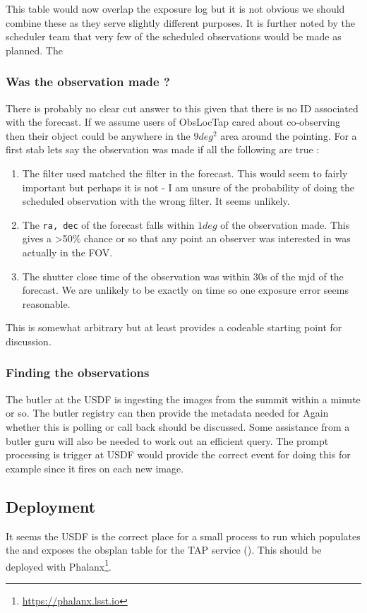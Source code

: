 This table would now overlap the exposure log but it is not obvious we should combine these as they serve slightly different purposes.
It is further noted by the scheduler team that very few of the scheduled observations would be made as planned. The

\subsubsection{Was the  observation made ?}\label{sec:made}
There is probably no clear cut answer to this given that there is no ID associated with the forecast.
If we assume users of ObsLocTap cared about co-observing then their object could be anywhere in the
$9 deg^2$ area around the pointing.
For a first stab lets say the observation was made if all the following are true :

\begin{enumerate}
\item The filter used matched the filter in the forecast.
This would seem to fairly important but perhaps it is not - I am unsure of the probability of
doing the scheduled observation with the wrong filter. It seems unlikely.
\item The \texttt {ra, dec} of the forecast falls within $1 deg$ of the observation made.
This gives a >50\% chance or so that any point an observer was interested in was actually in the FOV.
\item The shutter close time of the observation was within 30s of the mjd of the forecast.
We are unlikely to be exactly on time so one exposure error seems reasonable.
\end{enumerate}

This is somewhat arbitrary but at least provides a codeable starting point for discussion.

\subsubsection{Finding the observations}
The butler at the USDF is ingesting the images from the summit within a minute or so.
The butler registry can then provide the metadata needed for  
Again whether this is polling or call back should be discussed.
Some assistance from  a butler guru will also be needed to work out an efficient query.
The prompt processing is trigger at USDF would provide the correct event for doing this for example since it fires on each new image.

\subsection{Deployment}
It seems the USDF is the correct place for a small process to run which populates the \DB and exposes the obsplan table for the TAP service ().
This should be deployed with Phalanx\footnote{\url{https://phalanx.lsst.io}}.

